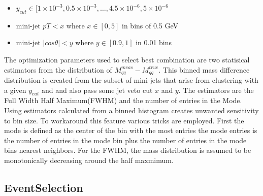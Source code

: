 \begin{itemize}
\item $y_{cut} \in [1\times 10^{-3}, 0.5\times 10^{-3}, \ldots , 4.5\times 10^{-6}, 5\times 10^{-6}$
\item mini-jet $pT < x $ where $ x \in [0,5]$ in bins of 0.5 GeV
\item mini-jet $|cos\theta| < y $ where $y \in [0.9, 1]$ in 0.01 bins
\end{itemize}
The optimization parameters used to select best combination are two statisical estimators from the distribution of $M_{qq}^{meas} - M_{qq}^{true}$. This binned mass difference distribution is created from the subset of mini-jets that arise from clustering with a given $y_{cut}$ and and also pass some jet veto cut $x$ and $y$. The estimators are the Full Width Half Maximum(FWHM) and the number of entries in the Mode.  
Using estimators calculated from a binned histogram creates unwanted sensitivity to bin size. To workaround this feature various tricks are employed. First the mode is defined as the center of the bin with the most entries the mode entries is the number of entries in the mode bin plus the number of entries in the mode bins nearest neighbors. For the FWHM, the mass distribution is assumed to be monotonically decreasing around the half maxmimum. 


\subsection{EventSelection}
\label{subsec:EventSelection}